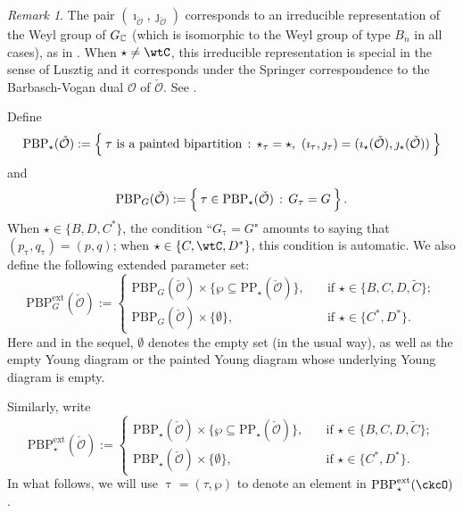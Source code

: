 \documentclass[11pt,a4paper]{amsart}
\newcommand{\CO}{{\mathcal {O}}}
\numberwithin{equation}{section}
\theoremstyle{remark}
\newtheorem*{remark}{Remark}
\def\PBPes{\mathrm{PBP}^{\mathrm{ext}}_{\star}}
\begin{document}
\begin{remark} The pair $(\imath_{\check \CO}, \jmath_{\check \CO})$ corresponds to an irreducible representation of the  Weyl group of $G_{\mathbb{C}}$ (which is isomorphic to the Weyl group of type $B_n$ in all cases), as in \cite[Section 11.4]{Carter}.  When $\star\neq \wtC$, this irreducible representation is special in the sense of Lusztig \cite{Lsp} and it corresponds under the Springer correspondence to the Barbasch-Vogan dual $\CO$ of $\check \CO$. See \cite[Section 8]{BMSZa}.

\end{remark}


Define
\[
\mathrm{PBP}_\star(\check \CO):=\Set{
\tau\textrm{ is a painted bipartition}  \,:\,  \star_\tau = \star, \ (\imath_\tau,\jmath_\tau) = (\imath_\star(\check \CO), \jmath_\star(\check \CO))
}
\]
and
\[
\mathrm{PBP}_G(\check \CO)\\
:=\Set{
\tau\in \mathrm{PBP}_\star(\check \CO)  \,:\,  G_\tau=G
}.
\]
When $\star\in \{B, D, C^*\}$,  the condition ``$G_{\uptau} = G$" amounts to saying that $(p_\uptau, q_\uptau)=(p,q)$; when  $\star\in \{C, \wtC, D^*\}$, this condition is automatic.
We also define the following extended parameter set:
\begin{equation}\label{def:PBPes}
\mathrm{PBP}^{\mathrm{ext}}_G(\check \CO):=\begin{cases}
\mathrm{PBP}_G(\check \CO)\times \{\wp\subseteq \mathrm{PP}_\star(\check \CO)\},\quad& \textrm{if }\star\in \{B,C, D, \widetilde C\};\\
\mathrm{PBP}_G(\check \CO)\times \{\emptyset \},\quad& \textrm{if }\star\in \{C^*, D^*\}.
\end{cases}
\end{equation}
Here and in the sequel, $\emptyset$ denotes the empty set (in the usual way), as well as the empty Young diagram or the painted Young diagram whose underlying Young diagram is empty.

Similarly, write  %
\[
\mathrm{PBP}^{\mathrm{ext}}_\star(\check \CO):=\begin{cases}
\mathrm{PBP}_\star(\check \CO)\times \{\wp\subseteq \mathrm{PP}_\star(\check \CO)\},\quad& \textrm{if }\star\in \{B,C, D, \widetilde C\};\\
\mathrm{PBP}_\star(\check \CO)\times \{\emptyset \},\quad& \textrm{if }\star\in \{C^*, D^*\}.
\end{cases}
\]
In what follows, we will use $\uptau=(\tau,\wp)$ to denote an element in $\PBPes(\ckcO)$.
\end{document}
